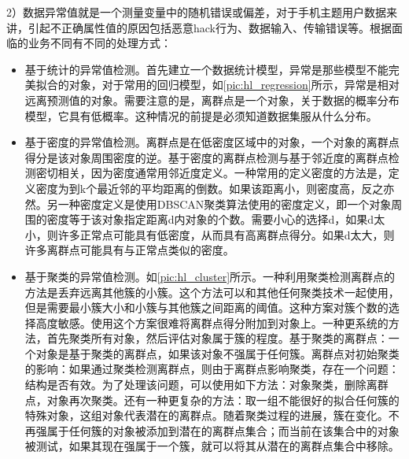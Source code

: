   2）数据异常值就是一个测量变量中的随机错误或偏差，对于手机主题用户数据来讲，引起不正确属性值的原因包括恶意hack行为、数据输入、传输错误等。根据面临的业务不同有不同的处理方式：
  \begin{itemize}
  \item 基于统计的异常值检测。首先建立一个数据统计模型，异常是那些模型不能完美拟合的对象，对于常用的回归模型，如\autoref{pic:hl_regression}所示，异常是相对远离预测值的对象。需要注意的是，离群点是一个对象，关于数据的概率分布模型，它具有低概率。这种情况的前提是必须知道数据集服从什么分布。
  \begin{figure}
  \centering
    \label{pic:hl_regression}
  \end{figure}
  \item 基于密度的异常值检测。离群点是在低密度区域中的对象，一个对象的离群点得分是该对象周围密度的逆。基于密度的离群点检测与基于邻近度的离群点检测密切相关，因为密度通常用邻近度定义。一种常用的定义密度的方法是，定义密度为到k个最近邻的平均距离的倒数。如果该距离小，则密度高，反之亦然。另一种密度定义是使用DBSCAN聚类算法使用的密度定义，即一个对象周围的密度等于该对象指定距离d内对象的个数。需要小心的选择d，如果d太小，则许多正常点可能具有低密度，从而具有高离群点得分。如果d太大，则许多离群点可能具有与正常点类似的密度。
  \item 基于聚类的异常值检测。如\autoref{pic:hl_cluster}所示。一种利用聚类检测离群点的方法是丢弃远离其他簇的小簇。这个方法可以和其他任何聚类技术一起使用，但是需要最小簇大小和小簇与其他簇之间距离的阈值。这种方案对簇个数的选择高度敏感。使用这个方案很难将离群点得分附加到对象上。一种更系统的方法，首先聚类所有对象，然后评估对象属于簇的程度。基于聚类的离群点：一个对象是基于聚类的离群点，如果该对象不强属于任何簇。离群点对初始聚类的影响：如果通过聚类检测离群点，则由于离群点影响聚类，存在一个问题：结构是否有效。为了处理该问题，可以使用如下方法：对象聚类，删除离群点，对象再次聚类。还有一种更复杂的方法：取一组不能很好的拟合任何簇的特殊对象，这组对象代表潜在的离群点。随着聚类过程的进展，簇在变化。不再强属于任何簇的对象被添加到潜在的离群点集合；而当前在该集合中的对象被测试，如果其现在强属于一个簇，就可以将其从潜在的离群点集合中移除。

\end{itemize}
